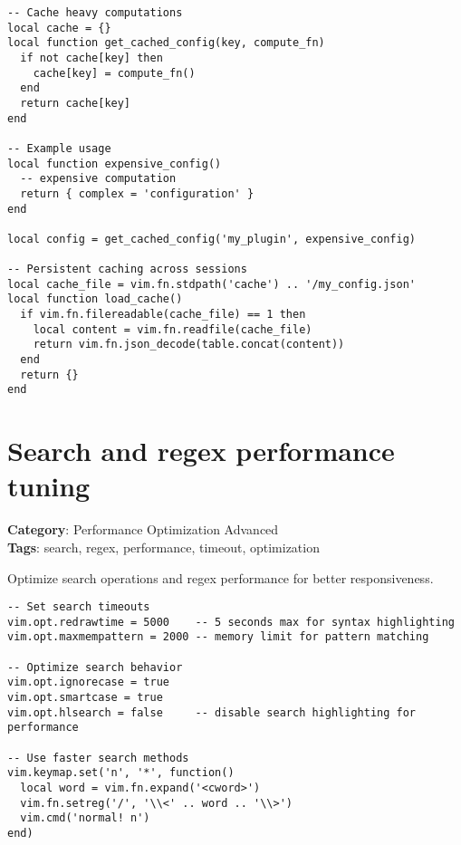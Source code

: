 {{{{{{{{{\begin{Exa*}{}
\begin{Verbatim}[fontsize=\footnotesize, breaklines, breakanywhere]
-- Cache heavy computations
local cache = {}
local function get_cached_config(key, compute_fn)
  if not cache[key] then
    cache[key] = compute_fn()
  end
  return cache[key]
end

-- Example usage
local function expensive_config()
  -- expensive computation
  return { complex = 'configuration' }
end

local config = get_cached_config('my_plugin', expensive_config)

-- Persistent caching across sessions
local cache_file = vim.fn.stdpath('cache') .. '/my_config.json'
local function load_cache()
  if vim.fn.filereadable(cache_file) == 1 then
    local content = vim.fn.readfile(cache_file)
    return vim.fn.json_decode(table.concat(content))
  end
  return {}
end
\end{Verbatim}
\end{Exa*}

\section{Search and regex performance tuning}

\textbf{Category}: Performance Optimization Advanced\\ \textbf{Tags}: search, regex, performance, timeout, optimization
\vspace{0.5cm}

Optimize search operations and regex performance for better responsiveness.

\begin{Exa*}{}
\begin{Verbatim}[fontsize=\footnotesize, breaklines, breakanywhere]
-- Set search timeouts
vim.opt.redrawtime = 5000    -- 5 seconds max for syntax highlighting
vim.opt.maxmempattern = 2000 -- memory limit for pattern matching

-- Optimize search behavior
vim.opt.ignorecase = true
vim.opt.smartcase = true
vim.opt.hlsearch = false     -- disable search highlighting for performance

-- Use faster search methods
vim.keymap.set('n', '*', function()
  local word = vim.fn.expand('<cword>')
  vim.fn.setreg('/', '\\<' .. word .. '\\>')
  vim.cmd('normal! n')
end)
\end{Verbatim}
\end{Exa*}

}}}}}}}}}
